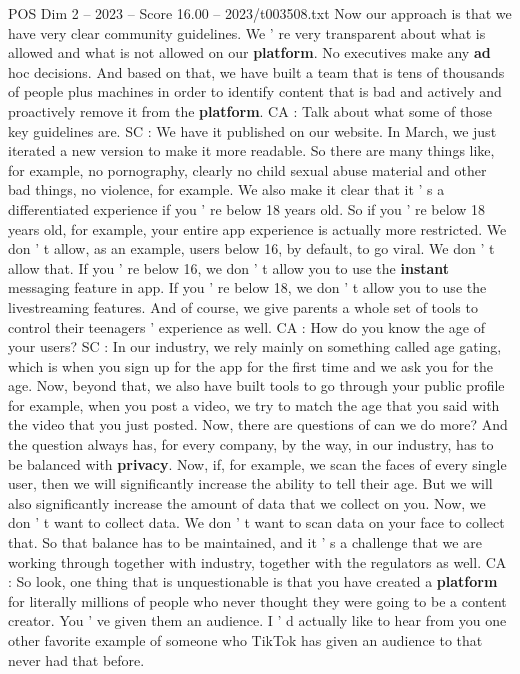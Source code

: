 \begin{textsample}{POS Dim 2 – 2023 – Score 16.00 – 2023/t003508.txt}
Now our approach is that we have very clear community guidelines.
We ' re very transparent about what is allowed and what is not allowed on our \textbf{platform}.
No executives make any \textbf{ad} hoc decisions.
And based on that, we have built a team that is tens of thousands of people plus machines in order to identify content that is bad and actively and proactively remove it from the \textbf{platform}.
CA : Talk about what some of those key guidelines are.
SC : We have it published on our website.
In March, we just iterated a new version to make it more readable.
So there are many things like, for example, no pornography, clearly no child sexual abuse material and other bad things, no violence, for example.
We also make it clear that it ' s a differentiated experience if you ' re below 18 years old.
So if you ' re below 18 years old, for example, your entire app experience is actually more restricted.
We don ' t allow, as an example, users below 16, by default, to go viral.
We don ' t allow that.
If you ' re below 16, we don ' t allow you to use the \textbf{instant} messaging feature in app.
If you ' re below 18, we don ' t allow you to use the livestreaming features.
And of course, we give parents a whole set of tools to control their teenagers ' experience as well.
CA : How do you know the age of your users?
SC : In our industry, we rely mainly on something called age gating, which is when you sign up for the app for the first time and we ask you for the age.
Now, beyond that, we also have built tools to go through your public profile for example, when you post a video, we try to match the age that you said with the video that you just posted.
Now, there are questions of can we do more?
And the question always has, for every company, by the way, in our industry, has to be balanced with \textbf{privacy}.
Now, if, for example, we scan the faces of every single user, then we will significantly increase the ability to tell their age.
But we will also significantly increase the amount of data that we collect on you.
Now, we don ' t want to collect data.
We don ' t want to scan data on your face to collect that.
So that balance has to be maintained, and it ' s a challenge that we are working through together with industry, together with the regulators as well.
CA : So look, one thing that is unquestionable is that you have created a \textbf{platform} for literally millions of people who never thought they were going to be a content creator.
You ' ve given them an audience.
I ' d actually like to hear from you one other favorite example of someone who TikTok has given an audience to that never had that before.

\end{textsample}
